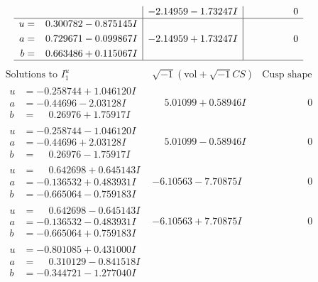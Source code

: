 \documentclass[1p]{elsarticle_modified}
\theoremstyle{definition}
\newcommand{\I}{\sqrt{-1}}
\begin{document}
$$\begin{array}{c|c|c}
 & -2.14959 - 1.73247 I & \phantom{-0.000000 } 0 \\ \hline\begin{aligned}
u &= \phantom{-}0.300782 - 0.875145 I \\
a &= \phantom{-}0.729671 - 0.099867 I \\
b &= \phantom{-}0.663486 + 0.115067 I\end{aligned}
 & -2.14959 + 1.73247 I & \phantom{-0.000000 } 0\\
 \hline 
 \end{array}$$\newpage$$\begin{array}{c|c|c}  
\text{Solutions to }I^u_{1}& \I (\text{vol} + \sqrt{-1}CS) & \text{Cusp shape}\\
 \hline 
\begin{aligned}
u &= -0.258744 + 1.046120 I \\
a &= -0.44696 - 2.03128 I \\
b &= \phantom{-}0.26976 + 1.75917 I\end{aligned}
 & \phantom{-}5.01099 + 0.58946 I & \phantom{-0.000000 } 0 \\ \hline\begin{aligned}
u &= -0.258744 - 1.046120 I \\
a &= -0.44696 + 2.03128 I \\
b &= \phantom{-}0.26976 - 1.75917 I\end{aligned}
 & \phantom{-}5.01099 - 0.58946 I & \phantom{-0.000000 } 0 \\ \hline\begin{aligned}
u &= \phantom{-}0.642698 + 0.645143 I \\
a &= -0.136532 + 0.483931 I \\
b &= -0.665064 - 0.759183 I\end{aligned}
 & -6.10563 - 7.70875 I & \phantom{-0.000000 } 0 \\ \hline\begin{aligned}
u &= \phantom{-}0.642698 - 0.645143 I \\
a &= -0.136532 - 0.483931 I \\
b &= -0.665064 + 0.759183 I\end{aligned}
 & -6.10563 + 7.70875 I & \phantom{-0.000000 } 0 \\ \hline\begin{aligned}
u &= -0.801085 + 0.431000 I \\
a &= \phantom{-}0.310129 - 0.841518 I \\
b &= -0.344721 - 1.277040 I\end{aligned}

\end{array}$$
\end{document}

